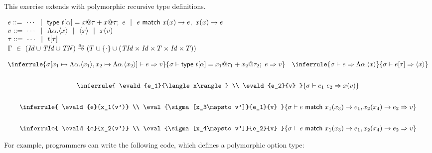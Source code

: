 \begin{exercise}

This exercise extends \lang with polymorphic recursive type definitions.

\vspace{1em}
$
  \begin{array}{l}
    e ::=\ \cdots\ \ |\ \ \textsf{type}\ t[\alpha]=x@\tau+x@\tau;\ e\ \ |\ \
           e\ \textsf{match}\ x(x)\rightarrow e,\ x(x)\rightarrow e \\
    v ::=\ \cdots\ \ |\ \ \Lambda\alpha.\langle x\rangle\ \ |\ \ \langle x\rangle\ \ |\ \  x(v) \\
    \tau ::=\ \cdots\ \ |\ \  t[\tau] \\
    \Gamma\ \in\ (\embox{Id}\cup\embox{TId}\cup\embox{TN})\finto
    {(T\cup\{\cdot\}
    \cup(\embox{TId}\times\embox{Id}\times T\times\embox{Id}\times T))}
  \end{array}
$
\vspace{0.5em}

$
  \begin{array}{c}
  \inferrule
  { \eval{\sigma[x_1\mapsto\Lambda\alpha.\langle x_1\rangle,x_2\mapsto\Lambda\alpha.\langle x_2\rangle]}{e}{v} }
  { \evald{\textsf{type}\ t[\alpha]=x_1@\tau_1+x_2@\tau_2;\ e}{v} }
  \quad
  \inferrule
  { \evald{e}{\Lambda \alpha.\langle x\rangle} }
  { \evald{\etapp{e}{\tau}}{\langle x\rangle} }
  \\[2em]
  \inferrule
  { \evald{e_1}{\langle x\rangle} \\ \evald{e_2}{v} }
  { \evald{\eapp{e_1}{e_2}}{x(v)} }
  \\[2em]
  \inferrule
  { \evald{e}{x_1(v')} \\ \eval{\sigma[x_3\mapsto v']}{e_1}{v} }
  { \evald{e\ \textsf{match}\ x_1(x_3)\rightarrow e_1,x_2(x_4)\rightarrow e_2}{v} }
  \\[2em]
  \inferrule
  { \evald{e}{x_2(v')} \\ \eval{\sigma[x_4\mapsto v']}{e_2}{v} }
  { \evald{e\ \textsf{match}\ x_1(x_3)\rightarrow e_1,x_2(x_4)\rightarrow e_2}{v} }
  \end{array}
$
\vspace{0.5em}

For example, programmers can write the following code, which defines a polymorphic
option type:


\end{exercise}
